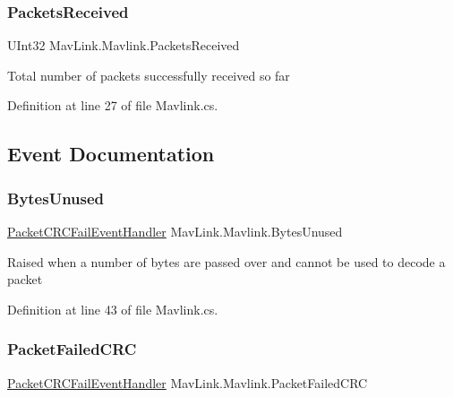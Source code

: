 \subsubsection{\texorpdfstring{PacketsReceived}{PacketsReceived}}
{\footnotesize\ttfamily U\+Int32 Mav\+Link.\+Mavlink.\+Packets\+Received\hspace{0.3cm}{\ttfamily [get]}}



Total number of packets successfully received so far 



Definition at line 27 of file Mavlink.\+cs.



\subsection{Event Documentation}
\mbox{\label{classMavLink_1_1Mavlink_a88f743816b644b0d36b05c188a452fab}} 
\subsubsection{\texorpdfstring{BytesUnused}{BytesUnused}}
{\footnotesize\ttfamily \mbox{\hyperlink{namespaceMavLink_a8ed8a6701876b63e5bb9135a9897d679}{Packet\+C\+R\+C\+Fail\+Event\+Handler}} Mav\+Link.\+Mavlink.\+Bytes\+Unused}



Raised when a number of bytes are passed over and cannot be used to decode a packet 



Definition at line 43 of file Mavlink.\+cs.

\mbox{\label{classMavLink_1_1Mavlink_ac73a6b5c5f3ecd09964ec630225fabdd}} 
\subsubsection{\texorpdfstring{PacketFailedCRC}{PacketFailedCRC}}
{\footnotesize\ttfamily \mbox{\hyperlink{namespaceMavLink_a8ed8a6701876b63e5bb9135a9897d679}{Packet\+C\+R\+C\+Fail\+Event\+Handler}} Mav\+Link.\+Mavlink.\+Packet\+Failed\+C\+RC}



